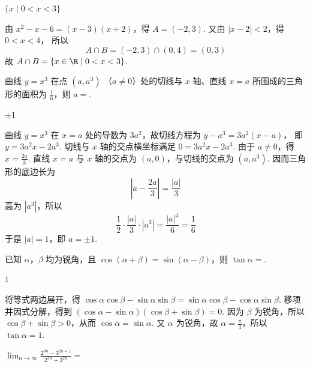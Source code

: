 \begin{answer}
\(\{x\mid 0<x<3\}\)
\end{answer}

\begin{solution}
由 \(x^2-x-6=(x-3)(x+2)\)，得 \(A=(-2,3)\). 又由 \(|x-2|<2\)，得 \(0<x<4\)，
所以
\[
A\cap B=(-2,3)\cap(0,4)=(0,3)
\]
故 \(A\cap B=\{x\in\R\mid0<x<3\}\).
\end{solution}

\begin{problem}
曲线 \( y = x^{3} \) 在点 \( (a, a^{3}) \) （\( a \neq 0 \)）处的切线与 \( x \) 轴、直线 \( x = a \) 所围成的三角形的面积为 \( \frac{1}{6} \)，则 \( a = \)\fillinblank{}.
\end{problem}

\begin{answer}
\(\pm 1\)
\end{answer}

\begin{solution}
曲线 \(y=x^3\) 在 \(x=a\) 处的导数为 \(3a^2\)，故切线方程为 \(y-a^3=3a^2(x-a)\)，
即 \(y=3a^2x-2a^3\). 切线与 \(x\) 轴的交点横坐标满足 \(0=3a^2x-2a^3\). 由于 \(a\ne0\)，得 \(x=\frac{2a}{3}\). 直线 \(x=a\) 与 \(x\) 轴的交点为 \((a,0)\)，与切线的交点为 \((a,a^3)\). 因而三角形的底边长为
\[
\left|a-\frac{2a}{3}\right|=\frac{|a|}{3}
\]
高为 \(|a^3|\)，所以
\[
\frac12\cdot\frac{|a|}{3}\cdot|a^3|=\frac{|a|^4}{6}=\frac16
\]
于是 \(|a|=1\)，即 \(a=\pm1\).
\end{solution}

\begin{problem}
已知 \(\alpha\)，\(\beta\) 均为锐角，且 \(\cos (\alpha + \beta) = \sin (\alpha - \beta)\)，则 \(\tan \alpha = \)\fillinblank{}.
\end{problem}

\begin{answer}
\(1\)
\end{answer}

\begin{solution}
将等式两边展开，得 \(\cos\alpha\cos\beta-\sin\alpha\sin\beta=\sin\alpha\cos\beta-\cos\alpha\sin\beta\). 移项并因式分解，得到 \((\cos\alpha-\sin\alpha)(\cos\beta+\sin\beta)=0\).
因为 \(\beta\) 为锐角，所以 \(\cos\beta+\sin\beta>0\)，从而 \(\cos\alpha=\sin\alpha\). 又 \(\alpha\) 为锐角，故 \(\alpha=\frac\pi4\)，所以 \(\tan\alpha=1\).
\end{solution}

\begin{problem}
\(\displaystyle\lim_{n\to \infty}\frac{2^{3n} - 3^{2n + 1}}{2^{3n} + 3^{2n}} =\)\fillinblank{}
\end{problem}

